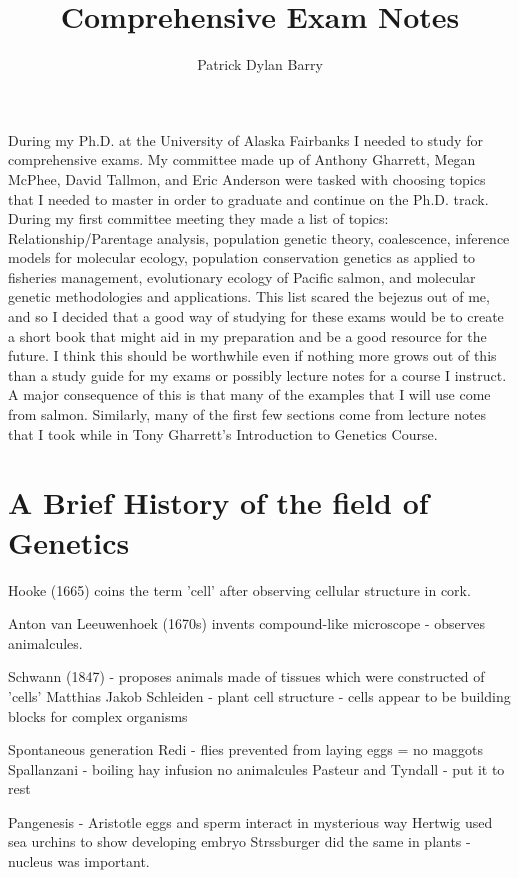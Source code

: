 \documentclass{report}\usepackage[]{graphicx}\usepackage[]{color}
\title{Comprehensive Exam Notes}
\author{Patrick Dylan Barry}
\begin{document}
\maketitle
\abstract{}
During my Ph.D. at the University of Alaska Fairbanks I needed to study for comprehensive exams.
My committee made up of Anthony Gharrett, Megan McPhee, David Tallmon, and Eric Anderson 
were tasked with choosing topics that I needed to master in order to graduate and continue on the 
Ph.D. track. During my first committee meeting they made a list of topics: Relationship/Parentage analysis,
population genetic theory, coalescence, inference models for molecular ecology, population conservation 
genetics as applied to fisheries management, evolutionary ecology of Pacific salmon, and molecular genetic 
methodologies and applications. This list scared the bejezus out of me, and so I decided 
 that a good way of studying for these exams would be to create a short book that 
might aid in my preparation and be a good resource for the future. I think this should be worthwhile even
if nothing more grows out of this than a study guide for my exams or possibly lecture notes for a course I 
instruct. A major consequence of this is that many of the examples that I will use come from salmon. Similarly,
many of the first few sections come from lecture notes that I took while in Tony Gharrett's Introduction to Genetics Course. 

\newpage

\tableofcontents

\newpage

\chapter{A Brief History of the field of Genetics}
Hooke (1665) coins the term 'cell' after observing cellular structure in cork.

Anton van Leeuwenhoek (1670s) invents compound-like microscope - observes animalcules.

Schwann (1847) - proposes animals made of tissues which were constructed of 'cells'
Matthias Jakob Schleiden - plant cell structure - cells appear to be building blocks for complex organisms

Spontaneous generation
Redi - flies prevented from laying eggs = no maggots
Spallanzani - boiling hay infusion no animalcules
Pasteur and Tyndall - put it to rest
 
 Pangenesis -
 Aristotle eggs and sperm interact in mysterious way
 Hertwig used sea urchins to show developing embryo
 Strssburger did the same in plants - nucleus was important. 
 
\end{document}
